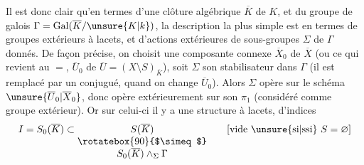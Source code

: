 Il est donc clair qu'en termes d'une
clôture algébrique \(\overline K\) de \(K\), et du
groupe de galois  \(\Gamma=\operatorname{Gal}(\overline K/\unsure{K|k})\), la
description la plus simple est en
termes de groupes extérieurs à lacets, et
d'actions extérieures de sous-groupes  \(\Sigma\) de \(\Gamma\)
donnés. De façon précise,  on
choisit une composante connexe
\(\overline X_0\) de \(\overline X\) (ou ce qui revient au \(=\),
\(\overline U_0\) de \(\overline U=(X\setminus S)_{\overline K}\)), soit \(\Sigma\) son
stabilisateur dans \(\Gamma\) (il est remplacé
par un conjugué, quand on change
\(\overline U_0\)). Alors \(\Sigma\) opère sur le schéma
\(\unsure{\overline U_0|\overline X_0}\), donc opère extérieurement sur son
\(\pi_1\) (considéré comme groupe extérieur).
Or sur celui-ci il y a une structure
à lacets,   d'indices
\[
I=S_0(\overline K)\subset \begin{array}[t]{@{}c@{}}S(\overline K)\\ \rotatebox{90}{$\simeq$}\\ S_0(\overline K)\wedge_\Sigma\Gamma\end{array}
\qquad[\text{vide \unsure{si|ssi} }S=\varnothing]
\]
